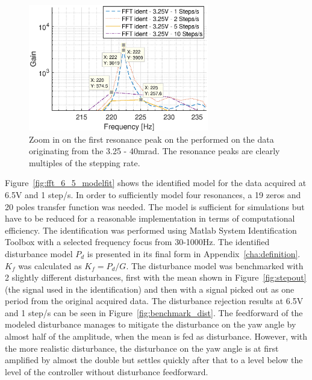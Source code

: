 \begin{figure}[h!]
  \centering
  \includegraphics[width=0.7\textwidth]{fig/matlab/fft_mean_in_out_3V_zoomin.eps}
  \caption{\label{fig:3vzoomin} Zoom in on the first resonance peak on the \abbrFFT performed on the data originating from the 3.25 - 40mrad. The resonance peaks are clearly multiples of the stepping rate.}
\end{figure}
\FloatBarrier
Figure~\ref{fig:fft_6_5_modelfit} shows the identified model for the data acquired at 6.5V and 1 step/s. In order to sufficiently model four resonances, a 19 zeros and 20 poles transfer function was needed. The model is sufficient for simulations but have to be reduced for a reasonable implementation in terms of computational efficiency. The identification was performed using Matlab System Identification Toolbox with a selected frequency focus from 30-1000Hz. The identified disturbance model $P_d$ is presented in its final form in Appendix~\ref{cha:definition}. $K_f$ was calculated as $K_f=P_d/G$.
The disturbance model was benchmarked with 2 slightly different disturbances, first with the mean shown in Figure~\ref{fig:stepout} (the signal used in the identification) and then with a signal picked out as one period from the original acquired data. The disturbance rejection results at 6.5V and 1 step/s can be seen in Figure~\ref{fig:benchmark_dist}. The feedforward of the modeled disturbance manages to mitigate the disturbance on the yaw angle by almost half of the amplitude, when the mean is fed as disturbance. However, with the more realistic disturbance, the disturbance on the yaw angle is at first amplified by almost the double but settles quickly after that to a level below the level of the controller without disturbance feedforward.

